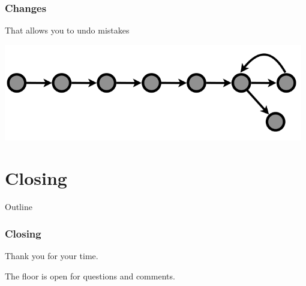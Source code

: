   \begin{frame}[t]
    \frametitle{Changes}
    That allows you to undo mistakes
    \begin{center}
      \includegraphics[width=0.98\textwidth]{../images/from-wickham-06.png} 
    \end{center} 
  \end{frame}



  \section{Closing}
  \begin{frame}[t]{Outline}
  \end{frame}

  \begin{frame}[t] 
    \frametitle{Closing}
    \begin{center}
    Thank you for your time.

    \vspace{1in}

    The floor is open for questions and comments.
    \end{center} 
  \end{frame}



